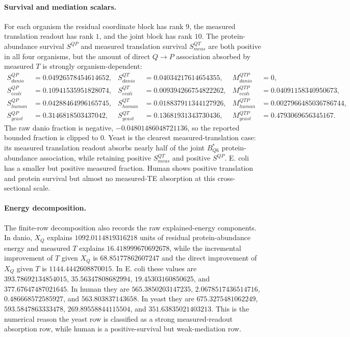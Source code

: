 \paragraph{Survival and mediation scalars.}
For each organism the residual coordinate block has rank $9$, the measured translation readout has rank $1$, and the joint block has rank $10$.  The protein-abundance survival $S^{QP}$ and measured translation survival $S^{QT}_{meas}$ are both positive in all four organisms, but the amount of direct $Q \to P$ association absorbed by measured $T$ is strongly organism-dependent:
$$
\begin{aligned}
S^{QP}_{danio} &= 0.04926578454614652, & S^{QT}_{danio} &= 0.04034217614654355, & M^{QTP}_{danio} &= 0,\\
S^{QP}_{ecoli} &= 0.10941535951828074, & S^{QT}_{ecoli} &= 0.009394266754822262, & M^{QTP}_{ecoli} &= 0.04091158340950673,\\
S^{QP}_{human} &= 0.04288464996165745, & S^{QT}_{human} &= 0.018837911344127926, & M^{QTP}_{human} &= 0.0027966485036786744,\\
S^{QP}_{yeast} &= 0.3146818503437042, & S^{QT}_{yeast} &= 0.13681931343730436, & M^{QTP}_{yeast} &= 0.4793069656345167.
\end{aligned}
$$
The raw danio fraction is negative, $-0.04801486048721136$, so the reported bounded fraction is clipped to $0$.  Yeast is the clearest measured-translation case: its measured translation readout absorbs nearly half of the joint $B^{\ast}_{Q6}$ protein-abundance association, while retaining positive $S^{QT}_{meas}$ and positive $S^{QP}$.  E. coli has a smaller but positive measured fraction.  Human shows positive translation and protein survival but almost no measured-TE absorption at this cross-sectional scale.

\paragraph{Energy decomposition.}
The finite-row decomposition also records the raw explained-energy components.  In danio, $X_Q$ explains $1092.0114819316218$ units of residual protein-abundance energy and measured $T$ explains $16.418999670692678$, while the incremental improvement of $T$ given $X_Q$ is $68.85177862607247$ and the direct improvement of $X_Q$ given $T$ is $1144.4442608870015$.  In E. coli these values are $393.78692134854015$, $35.56347808682994$, $19.45303160850625$, and $377.67647487021645$.  In human they are $565.3850203147235$, $2.0678517436514716$, $0.486668572585927$, and $563.803837143658$.  In yeast they are $675.3275481062249$, $593.5847863333478$, $269.89558844115504$, and $351.63835021403213$.  This is the numerical reason the yeast row is classified as a strong measured-readout absorption row, while human is a positive-survival but weak-mediation row.

